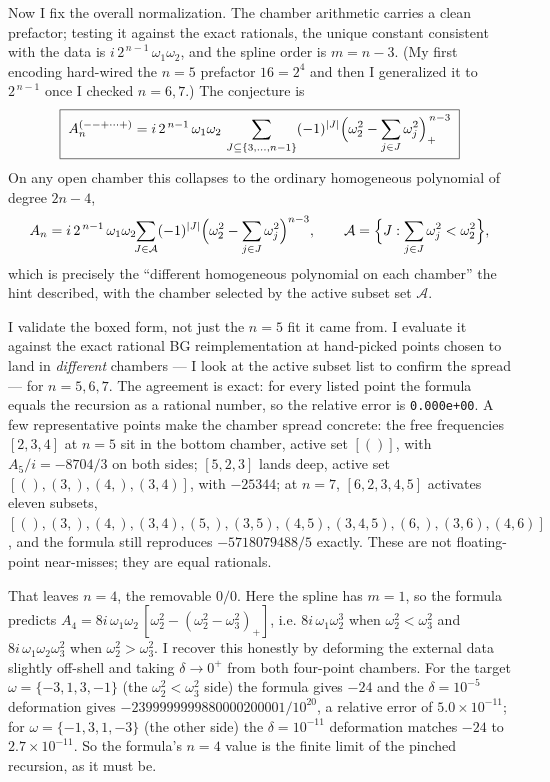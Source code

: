 \documentclass{article}
\begin{document}
Now I fix the overall normalization. The chamber arithmetic carries a clean
prefactor; testing it against the exact rationals, the unique constant consistent
with the data is $i\,2^{\,n-1}\,\omega_1\omega_2$, and the spline order is
$m=n-3$. (My first encoding hard-wired the $n=5$ prefactor $16=2^{4}$ and then I
generalized it to $2^{\,n-1}$ once I checked $n=6,7$.) The conjecture is
\[
\boxed{\;
A_n^{(--+\cdots+)}
=i\,2^{\,n-1}\,\omega_1\omega_2\,
\sum_{J\subseteq\{3,\dots,n-1\}}(-1)^{|J|}
\Bigl(\omega_2^2-\sum_{j\in J}\omega_j^2\Bigr)_{+}^{\,n-3}\;}
\]
On any open chamber this collapses to the ordinary homogeneous polynomial of
degree $2n-4$,
\[
A_n=i\,2^{\,n-1}\,\omega_1\omega_2\!\!
\sum_{J\in\mathcal A}(-1)^{|J|}
\Bigl(\omega_2^2-\sum_{j\in J}\omega_j^2\Bigr)^{n-3},
\qquad
\mathcal A=\Bigl\{J:\sum_{j\in J}\omega_j^2<\omega_2^2\Bigr\},
\]
which is precisely the ``different homogeneous polynomial on each chamber'' the
hint described, with the chamber selected by the active subset set $\mathcal A$.

I validate the boxed form, not just the $n=5$ fit it came from. I evaluate it
against the exact rational BG reimplementation at hand-picked points chosen to
land in \emph{different} chambers --- I look at the active subset list to confirm
the spread --- for $n=5,6,7$. The agreement is exact: for every listed point the
formula equals the recursion as a rational number, so the relative error is
\texttt{0.000e+00}. A few representative points make the chamber spread concrete:
the free frequencies $[2,3,4]$ at $n=5$ sit in the bottom chamber, active set
$[()]$, with $A_5/i=-8704/3$ on both sides; $[5,2,3]$ lands deep, active set
$[(),(3,),(4,),(3,4)]$, with $-25344$; at $n=7$, $[6,2,3,4,5]$ activates eleven
subsets, $[(),(3,),(4,),(3,4),(5,),(3,5),(4,5),(3,4,5),(6,),(3,6),(4,6)]$, and
the formula still reproduces $-5718079488/5$ exactly. These are not
floating-point near-misses; they are equal rationals.

That leaves $n=4$, the removable $0/0$. Here the spline has $m=1$, so the formula
predicts $A_4=8i\,\omega_1\omega_2\,[\omega_2^2-(\omega_2^2-\omega_3^2)_+]$, i.e.
$8i\,\omega_1\omega_2^3$ when $\omega_2^2<\omega_3^2$ and
$8i\,\omega_1\omega_2\omega_3^2$ when $\omega_2^2>\omega_3^2$. I recover this
honestly by deforming the external data slightly off-shell and taking
$\delta\to0^+$ from both four-point chambers. For the target
$\omega=\{-3,1,3,-1\}$ (the $\omega_2^2<\omega_3^2$ side) the formula gives $-24$
and the $\delta=10^{-5}$ deformation gives
$-2399999999880000200001/10^{20}$, a relative error of $5.0\times10^{-11}$; for
$\omega=\{-1,3,1,-3\}$ (the other side) the $\delta=10^{-11}$ deformation matches
$-24$ to $2.7\times10^{-11}$. So the formula's $n=4$ value is the finite limit of
the pinched recursion, as it must be.
\end{document}
